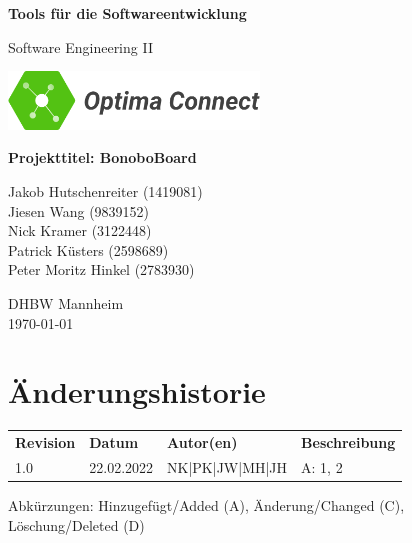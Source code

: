 \documentclass[a4paper,11pt]{scrartcl}
\begin{document}
\renewcommand*{\arraystretch}{1.2}
\begin{titlepage}
    \begin{center}
        \vspace*{1cm}\Huge
        \textbf{Tools für die Softwareentwicklung}\par                
        \vspace{0.5cm}\LARGE        
        Software Engineering II\par           
        \vspace{2cm}
        \includegraphics[width=0.5\textwidth]{OptimaLogo_long}\par   
        \vspace{1cm}
        \textbf{Projekttitel: BonoboBoard}\par        
        \vfill\Large   
        Jakob Hutschenreiter (1419081)\\Jiesen Wang (9839152)\\Nick Kramer (3122448)\\Patrick Küsters (2598689)\\Peter Moritz Hinkel (2783930)\par
        \vspace{2cm}
        DHBW Mannheim\\
        \today     
    \end{center}
\end{titlepage}

\section*{Änderungshistorie}
\begin{table}[h]
	\begin{tabular}{@{} p{20mm} p{25mm} p{35mm} p{75mm}}
		\textbf{Revision} & \textbf{Datum} & \textbf{Autor(en)} & \textbf{Beschreibung}\\
		1.0 & 22.02.2022 & NK|PK|JW|MH|JH & A: 1, 2\\
	\end{tabular}
\end{table}
\noindent
Abkürzungen: Hinzugefügt/Added (A), Änderung/Changed (C), Löschung/Deleted (D)
\vspace{2cm}
\tableofcontents
\newpage
{}
\end{document}
